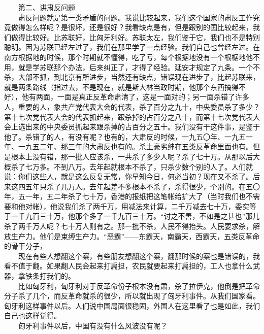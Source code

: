 \documentclass[cn,11pt,chinese]{elegantbook}
\begin{document}
　　第二、讲肃反问题\\
　　肃反问题就是第一类矛盾的问题。我说比较起来，我们这个国家的肃反工作究竟做得怎么样呢？是很坏，还是很好？我看缺点是有，但是跟别的国比较起来，我们做得比较好。比苏联好，比匈牙利好。苏联太左，我们鉴于它，我们也不是特别聪明。因为苏联已经左过了，我们在那里学了一点经验。我们自己也曾经左过。在南方根据地的时候，那个时期就不懂得，吃了亏，每个根据地没有一个根椐地他不用，就是学苏联那个办法，后来纠正了，才得了经验。延安才规定了九条。一个不杀，大部不抓，到北京有所进步，当然还有缺点，错误现在进步了，比起苏联来，就是两条路线（指过去，不是现在，就是斯大林当政时期，他那个东西搞得不好），他有两面，一面是真正反革命肃清了，这是一面对的；另一面杀错了许多人，重要的人，象共产党代表大会的代表，杀了百分之九十，中央委员杀了多少？第十七次党代表大会的代表抓起来，跟杀掉的占百分之八十，而第十七次党代表大会上选出来的中央委员抓起来跟杀掉的占百分之五十。我们没有干这件事，是鉴于他了。杀错了的人，有没有呢？也有的，大肃反的时候，一九五〇年、一九五一年、一九五二年、那三年的大肃反也有的。杀土豪劣绅在五类反革命里面也有。但是根本上没有错，那一批人应该杀，一共杀了多少人呢？杀了七十万。从那以后大概杀了七万多。不到八万。去年起就根本不杀了，只杀少数个别的人了。人们就说：你们这些人，就是这么反复无常，你早知今日，何必当初？现在又不杀了。后来这四五年只杀了几万人。去年起差不多根本不杀了，杀得很少，个别的。在五〇年，五一年，五二年杀了七十万，香港的报纸把这笔帐给扩大了（当时我们也不需要和他对帐），他说我们杀了两千万，用减法来计算，二千万减去七十万，委实等于一千九百三十万，他那个多了一千九百三十万。“讨之不善，不如是之甚也”那儿杀了两千万人呢？七十万人则有之。那一批不杀，人民不得抬头。人民要求杀，解放生产力。他们是束缚生产力。“恶霸”——东霸天，南霸天，西霸天，五类反革命的骨干分子，\\
　　现在有些人想翻这个案，有些朋友想翻这个案，翻那时候的案也是错误的，我看不值于翻。如果翻人民会起来打扁担，农民就要起来打扁担的，工人也拿什么武器，拿铁条打我们的。\\
　　比如匈牙利，匈牙利对于反革命份子根本没有肃，杀了拉伊克，他倒是把革命分子杀了几个，而反革命就杀的很少，所以就出现了匈牙利事件。从我们国家看。匈牙利这样事件以后。人们说中国局面很稳固，外国人在这里看了也是如此，我们自己也这样觉得。\\
　　匈牙利事件以后，中国有没有什么风波没有呢？\\
\end{document}
